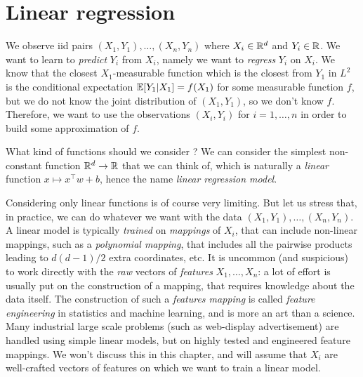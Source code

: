 

\setchapterpreamble[u]{\margintoc}
\chapter{Linear regression}
\label{chap:linear_regression}

We observe iid pairs $(X_1, Y_1), \ldots, (X_n, Y_n)$ where $X_i \in \mathbb R^d$ and $Y_i \in \mathbb R$.
We want to learn to \emph{predict} $Y_i$ from $X_i$, namely we want to \emph{regress} $Y_i$ on $X_i$.
We know that the closest $X_1$-measurable function which is the closest from $Y_1$ in $L^2$ is the conditional expectation $\mathbb E [Y_1 | X_1] = f(X_1)$ for some measurable function $f$, but we do not know the joint distribution of $(X_1, Y_1)$, so we don't know $f$.
Therefore, we want to use the observations $(X_i, Y_i)$ for $i=1, \ldots, n$ in order to build some approximation of $f$.

What kind of functions should we consider ?
We can consider the simplest non-constant function $\mathbb R^d \rightarrow \mathbb R$ that we can think of, which is naturally a \emph{linear} function $x \mapsto x^\top w + b$, hence the name \emph{linear regression model}.

\begin{kaobox}[frametitle=Features engineering]
	Considering only linear functions is of course very limiting. But let us stress that, in practice, we can do whatever we want with the data $(X_1, Y_1), \ldots, (X_n, Y_n)$. 
	A linear model is typically \emph{trained} on \emph{mappings} of $X_i$, that can include non-linear mappings, such as a \emph{polynomial mapping}, that includes all the pairwise products leading to $d(d-1)/2$ extra coordinates, etc.
	It is uncommon (and suspicious) to work directly with the \emph{raw} vectors of \emph{features} $X_1, \ldots, X_n$: a lot of effort is usually put on the construction of a mapping, that requires knowledge about the data itself.
	The construction of such a \emph{features mapping}%
	is called \emph{feature engineering} in statistics and machine learning, and is more an art than a science. 
	Many industrial large scale problems%
	(such as web-display advertisement) are handled using simple linear models, but on highly tested and engineered feature mappings. We won't discuss this in this chapter, and will assume that $X_i$ are well-crafted vectors of features on which we want to train a linear model.	
\end{kaobox}

